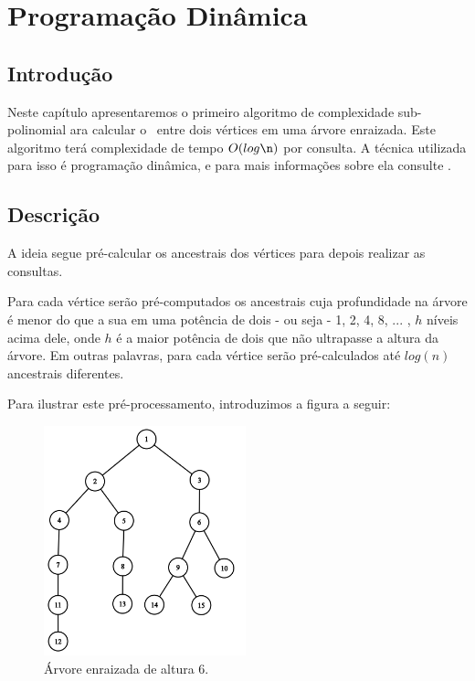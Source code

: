 \chapter{Programação Dinâmica}
\label{cap:programacao-dinamica}

\section{Introdução}

Neste capítulo apresentaremos o primeiro algoritmo de complexidade sub-polinomial ara calcular o \LCA\ entre dois vértices em uma árvore enraizada. Este algoritmo terá complexidade de tempo $O(log \n)$ por consulta. A técnica utilizada para isso é programação dinâmica, e para mais informações sobre ela consulte \cite{programacao-dinamica}. 

\section{Descrição}

A ideia segue pré-calcular os ancestrais dos vértices para depois realizar as consultas.

Para cada vértice serão pré-computados os ancestrais cuja profundidade na árvore é menor do que a sua em uma potência de dois - ou seja - 1, 2, 4, 8, ... , $h$ níveis acima dele, onde $h$ é a maior potência de dois que não ultrapasse a altura da árvore. Em outras palavras, para cada vértice serão pré-calculados até $log(n)$ ancestrais diferentes.

Para ilustrar este pré-processamento, introduzimos a figura a seguir:

\begin{figure}[htb]
\begin{center}
\includegraphics[width=5.85cm]{images/graph_dp.png}
\end{center}
\caption{\label{fig:arvore-6}Árvore enraizada de altura 6.}
\end{figure}

